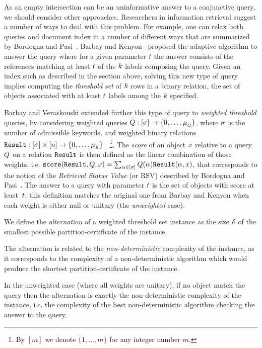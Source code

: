 As an empty intersection can be an uninformative answer to a
conjunctive query, we should consider other approaches. 
%
Researchers in information retrieval suggest a number of ways to deal
with this problem.
%
For example, one can relax both queries and document index in a number
of different ways that are summarized by Bordogna and
Pasi~\cite{DBLP:conf/essir/BordognaP00}.
%
Barbay and Kenyon~\cite{adaptiveIntersectionAndTThresholdProblems}
proposed the adaptive algorithm to answer the query where for a given
parameter $t$ the answer consists of the references matching
at least $t$ of the $k$ labels composing the query.
%
Given an index such as described in the section above, solving this
new type of query implies computing the {\em threshold set} of 
$k$ rows in a binary relation, the set of objects associated
with at least $t$ labels among the $k$ specified.

Barbay and Veraskouski
\cite{adaptiveAlgorithmsForWeightedQueriesOnWeightedBinaryRelationsAndLabeledTrees}
extended further this type of query to {\em weighted threshold}
queries, by considering
%
weighted queries $Q:[\sigma]\rightarrow\{0,\ldots,\mu_{_{Q}}\}$,
where $\sigma$ is the number of admissible keywords, and
%
weighted binary relations 
$\hbox{\tt Result}:[\sigma]\times[n]\rightarrow\{0,\ldots,\mu_{_{R}}\}$
~\footnote{By $[m]$ we denote $\{1, \ldots, m\}$ for any integer number $m$.}.
%
The {\em score} of an object $x$ relative to a query $Q$ on a
relation $\hbox{\tt Result}$ is then defined as the linear combination of those
weights, i.e. $\mathtt{score}(\hbox{\tt Result},Q,x) = \sum_{\alpha \in
  [\sigma]}{Q(\alpha)\hbox{\tt Result}(\alpha,x)}$, that corresponds to
the notion of the {\em Retrieval Status Value} (or RSV) described by
Bordogna and Pasi~\cite{DBLP:conf/essir/BordognaP00}.
%
The answer to a query with parameter $t$ is the set of
objects with score at least~$t$: this definition matches the
original one from Barbay and Kenyon when each weight is either null or
unitary (the {\em unweighted} case).

We define the {\em alternation} of a weighted threshold set instance
as the size $\delta$ of the smallest possible
partition-certificate of the instance.
%
\begin{LONG}
  The alternation is related to the {\em non-deterministic} complexity
  of the instance, as it corresponds to the complexity of a
  non-deterministic algorithm which would produce the shortest
  partition-certificate of the instance.
\end{LONG}
% 
In the unweighted case (where all weights are unitary), if no object
match the query then the alternation is exactly the non-deterministic
complexity of the instance, i.e. the complexity of the best
non-deterministic algorithm checking the answer to the query.


